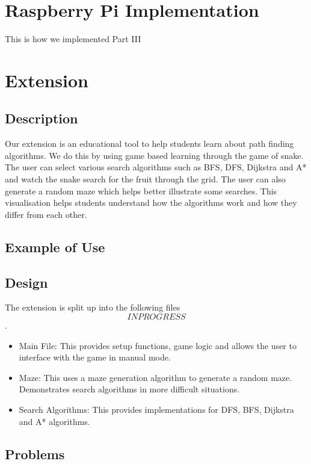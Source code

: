 \documentclass[11pt]{article}
\begin{document}
\section{Raspberry Pi Implementation}

This is how we implemented Part III

\section{Extension}

\subsection{Description}

Our extension is an educational tool to help students learn about path finding algorithms. 
We do this by using game based learning through the game of snake. The user can select various search algorithms 
such as BFS, DFS, Dijkstra and A* and watch the snake search for the fruit through the grid. 
The user can also generate a random maze which helps better illustrate some searches. 
This visualisation helps students understand how the algorithms work and how they differ from each other. 

\subsection{Example of Use}


\graphicspath{ {./images/} }


\subsection{Design}

The extension is split up into the following files \[IN PROGRESS\].
\begin{itemize}
    \item Main File: This provides setup functions, game logic and allows the user to interface with the game in manual mode.
    \item Maze: This uses a maze generation algorithm to generate a random maze. Demonstrates search algorithms in more difficult situations.
    \item Search Algorithms: This provides implementations for DFS, BFS, Dijkstra and A* algorithms.
\end{itemize}

\subsection{Problems}
\end{document}
